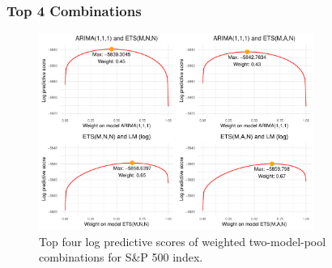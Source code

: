 \begin{frame}
    \frametitle{Top 4 Combinations}

\begin{figure}[ht]
\centering
\includegraphics[width=9cm]{Graph/best4comb.pdf}\\
{\tiny{Top four log predictive scores of weighted two-model-pool combinations for S\&P 500 index.}}
\end{figure}

\end{frame}


